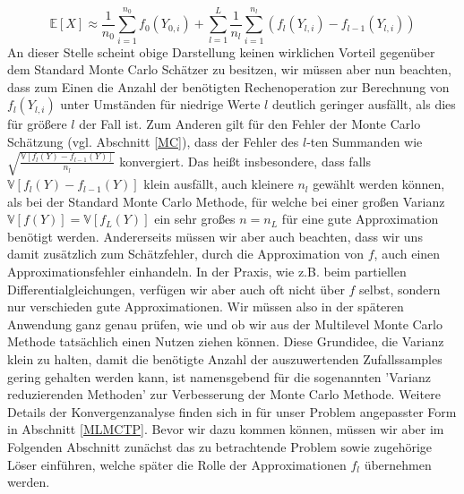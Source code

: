 \[
 \mathbb{E}[X] \approx \frac{1}{n_0} \sum_{i=1}^{n_0}f_0(Y_{0,i}) + \sum_{l=1}^{L} \frac{1}{n_l}\sum_{i=1}^{n_l} \left( f_l(Y_{l,i}) - f_{l-1}(Y_{l,i})\right)
\]
An dieser Stelle scheint obige Darstellung keinen wirklichen Vorteil gegenüber dem Standard Monte Carlo Schätzer zu besitzen, wir müssen aber nun beachten, dass zum Einen die Anzahl der benötigten Rechenoperation zur Berechnung von $ f_l(Y_{l,i}) $ unter Umständen für niedrige Werte $ l $ deutlich geringer ausfällt, als dies für größere $ l $ der Fall ist.
Zum Anderen gilt für den Fehler der Monte Carlo Schätzung (vgl. Abschnitt \ref{MC}), dass der Fehler des $l$-ten Summanden wie $ \sqrt{\frac{\mathbb{V}[f_l(Y) - f_{l-1}(Y)]}{n_l}} $ konvergiert. Das heißt insbesondere, dass falls $ \mathbb{V}[f_l(Y)-f_{l-1}(Y)] $ klein ausfällt, auch kleinere $ n_l $ gewählt werden können, als bei der Standard Monte Carlo Methode, für welche bei einer großen Varianz $ \mathbb{V}[f(Y)] = \mathbb{V}[f_L(Y)] $ ein sehr großes $ n=n_L $ für eine gute Approximation benötigt werden. Andererseits müssen wir aber auch beachten, dass wir uns damit zusätzlich zum Schätzfehler, durch die Approximation von $ f $, auch einen Approximationsfehler einhandeln. In der Praxis, wie z.B. beim partiellen Differentialgleichungen, verfügen wir aber auch oft nicht über $ f $ selbst, sondern nur verschieden gute Approximationen. Wir müssen also in der späteren Anwendung ganz genau prüfen, wie und ob wir aus der Multilevel Monte Carlo Methode tatsächlich einen Nutzen ziehen können. Diese Grundidee, die Varianz klein zu halten, damit die benötigte Anzahl der auszuwertenden Zufallssamples gering gehalten werden kann, ist namensgebend für die sogenannten 'Varianz reduzierenden Methoden' zur Verbesserung der Monte Carlo Methode. Weitere Details der Konvergenzanalyse finden sich in für unser Problem angepasster Form in Abschnitt \ref{MLMCTP}.
Bevor wir dazu kommen können, müssen wir aber im Folgenden Abschnitt zunächst das zu betrachtende Problem sowie zugehörige Löser einführen, welche später die Rolle der Approximationen $ f_l $ übernehmen werden.